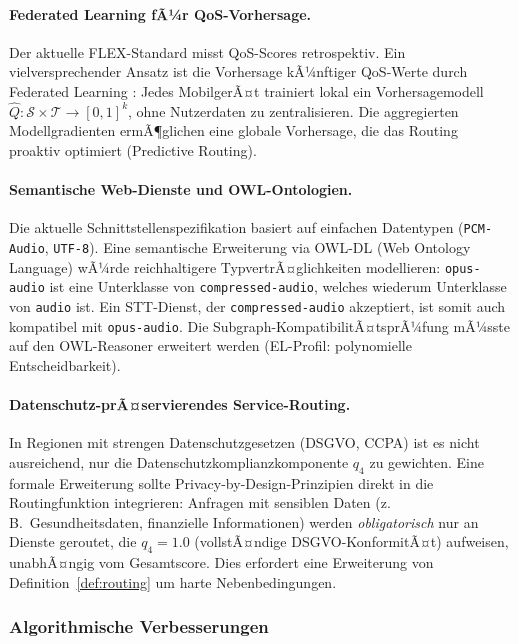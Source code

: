 ﻿\documentclass[a4paper,12pt]{article}
\theoremstyle{definition}
\begin{document}
\paragraph{Federated Learning fÃ¼r QoS-Vorhersage.}
Der aktuelle FLEX-Standard misst QoS-Scores retrospektiv. Ein vielversprechender Ansatz ist die Vorhersage kÃ¼nftiger QoS-Werte durch Federated Learning \cite{mcmahan2017}: Jedes MobilgerÃ¤t trainiert lokal ein Vorhersagemodell $\hat{Q}: \mathcal{S} \times \mathcal{T} \to [0,1]^k$, ohne Nutzerdaten zu zentralisieren. Die aggregierten Modellgradienten ermÃ¶glichen eine globale Vorhersage, die das Routing proaktiv optimiert (Predictive Routing).

\paragraph{Semantische Web-Dienste und OWL-Ontologien.}
Die aktuelle Schnittstellenspezifikation basiert auf einfachen Datentypen (\texttt{PCM-Audio}, \texttt{UTF-8}). Eine semantische Erweiterung via OWL-DL (Web Ontology Language) \cite{mcguinness2004} wÃ¼rde reichhaltigere TypvertrÃ¤glichkeiten modellieren: \texttt{opus-audio} ist eine Unterklasse von \texttt{compressed-audio}, welches wiederum Unterklasse von \texttt{audio} ist. Ein STT-Dienst, der \texttt{compressed-audio} akzeptiert, ist somit auch kompatibel mit \texttt{opus-audio}. Die Subgraph-KompatibilitÃ¤tsprÃ¼fung mÃ¼sste auf den OWL-Reasoner erweitert werden (EL-Profil: polynomielle Entscheidbarkeit).

\paragraph{Datenschutz-prÃ¤servierendes Service-Routing.}
In Regionen mit strengen Datenschutzgesetzen (DSGVO, CCPA) ist es nicht ausreichend, nur die Datenschutzkomplianzkomponente $q_4$ zu gewichten. Eine formale Erweiterung sollte Privacy-by-Design-Prinzipien \cite{cavoukian2009} direkt in die Routingfunktion integrieren: Anfragen mit sensiblen Daten (z.\,B.\ Gesundheitsdaten, finanzielle Informationen) werden \emph{obligatorisch} nur an Dienste geroutet, die $q_4 = 1.0$ (vollstÃ¤ndige DSGVO-KonformitÃ¤t) aufweisen, unabhÃ¤ngig vom Gesamtscore. Dies erfordert eine Erweiterung von Definition~\ref{def:routing} um harte Nebenbedingungen.

\subsubsection{Algorithmische Verbesserungen}
\end{document}
